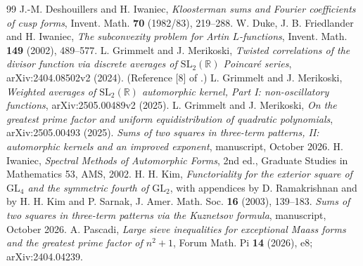 \documentclass[11pt]{amsart}
\theoremstyle{remark}
\theoremstyle{definition}
\numberwithin{equation}{section}
\newcommand{\R}{\mathbb{R}}
\newcommand{\SL}{\mathrm{SL}}
\begin{document}
\begin{thebibliography}{99}
 J.-M. Deshouillers and H. Iwaniec, \emph{Kloosterman sums and Fourier coefficients of cusp forms}, Invent. Math. \textbf{70} (1982/83), 219--288.
 W. Duke, J. B. Friedlander and H. Iwaniec, \emph{The subconvexity problem for Artin $L$-functions}, Invent. Math. \textbf{149} (2002), 489--577.
 L. Grimmelt and J. Merikoski, \emph{Twisted correlations of the divisor function via discrete averages of $\SL_2(\R)$ Poincar\'e series}, arXiv:2404.08502v2 (2024). (Reference [8] of \cite{GM1}.)
 L. Grimmelt and J. Merikoski, \emph{Weighted averages of $\SL_2(\R)$ automorphic kernel, Part I: non-oscillatory functions}, arXiv:2505.00489v2 (2025).
 L. Grimmelt and J. Merikoski, \emph{On the greatest prime factor and uniform equidistribution of quadratic polynomials}, arXiv:2505.00493 (2025).
 \emph{Sums of two squares in three-term patterns, II: automorphic kernels and an improved exponent}, manuscript, October 2026.
 H. Iwaniec, \emph{Spectral Methods of Automorphic Forms}, 2nd ed., Graduate Studies in Mathematics 53, AMS, 2002.
 H. H. Kim, \emph{Functoriality for the exterior square of $\mathrm{GL}_4$ and the symmetric fourth of $\mathrm{GL}_2$}, with appendices by D. Ramakrishnan and by H. H. Kim and P. Sarnak, J. Amer. Math. Soc. \textbf{16} (2003), 139--183.
 \emph{Sums of two squares in three-term patterns via the Kuznetsov formula}, manuscript, October 2026.
 A. Pascadi, \emph{Large sieve inequalities for exceptional Maass forms and the greatest prime factor of $n^2+1$}, Forum Math. Pi \textbf{14} (2026), e8; arXiv:2404.04239.
\end{thebibliography}
\end{document}
